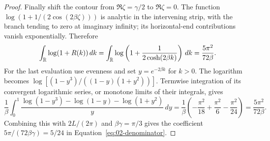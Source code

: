 \begin{proof}
Finally shift the contour from $\Re\zeta=\gamma/2$ to
$\Re\zeta=0$. The function
$\log(1+1/(2\cos(2\beta\zeta)))$ is analytic in the intervening
strip, with the branch tending to zero at imaginary infinity;
its horizontal-end contributions vanish exponentially. Therefore
\[
 \int_\mathbb R\log(1+R(k))\,dk
 =\int_\mathbb R\log\left(1+\frac1{2\cosh(2\beta k)}\right)\,dk
 =\frac{5\pi^2}{72\beta}.
\]
For the last evaluation use evenness and set $y=e^{-2\beta k}$ for
$k>0$. The logarithm becomes
$\log[(1-y^3)/((1-y)(1+y^2))]$. Termwise integration of its
convergent logarithmic series, or monotone limits of their integrals,
gives
\[
 \frac1\beta\int_0^1
 \frac{\log(1-y^3)-\log(1-y)-\log(1+y^2)}{y}\,dy
 =\frac1\beta\left(-\frac{\pi^2}{18}
                         +\frac{\pi^2}{6}-\frac{\pi^2}{24}\right)
 =\frac{5\pi^2}{72\beta}.
\]
Combining this with $2L/(2\pi)$ and
$\beta\gamma=\pi/3$ gives the coefficient
$5\pi/(72\beta\gamma)=5/24$ in
Equation~\eqref{eq:02-denominator}.
\end{proof}
